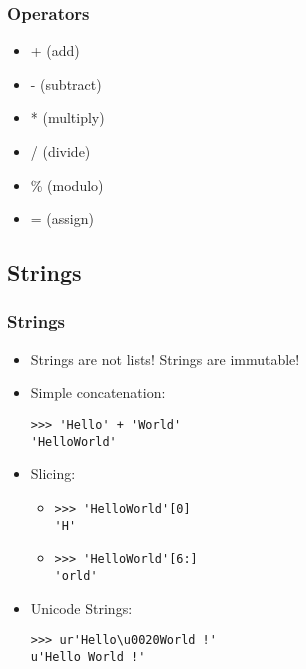 \documentclass{beamer}
\begin{document}
\begin{frame}
    \frametitle{Operators}
    \begin{itemize}
        \item<1-> + (add)
        \item<2-> - (subtract)
        \item<3-> * (multiply)
        \item<4-> / (divide)
        \item<5-> \% (modulo)
        \item<6-> =	(assign)
    \end{itemize}
\end{frame}

\subsection{Strings}
\begin{frame}[fragile]
    \frametitle{Strings}
    \begin{itemize}
        \item<1-> Strings are not lists! Strings are immutable!
        \item<2-> Simple concatenation: 
            \begin{verbatim}
>>> 'Hello' + 'World'
'HelloWorld'
            \end{verbatim}
        \item<3-> Slicing:
            \begin{itemize}
                \item<4->\begin{verbatim}
>>> 'HelloWorld'[0]
'H'
                    \end{verbatim}

                \item<5->\begin{verbatim}
>>> 'HelloWorld'[6:]
'orld'
                    \end{verbatim}

            \end{itemize}
        \item<6-> Unicode Strings:

            \begin{verbatim}
>>> ur'Hello\u0020World !'
u'Hello World !'
            \end{verbatim}

    \end{itemize}
\end{frame}
\end{document}
